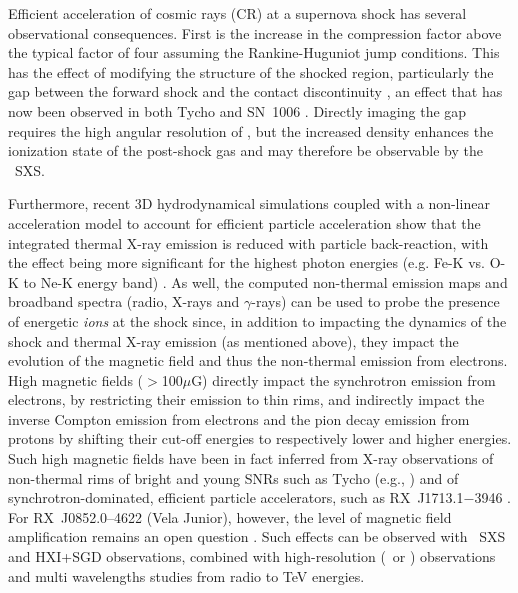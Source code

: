 \documentclass[11pt,a4paper]{article}
\begin{document}
{Efficient acceleration of cosmic rays (CR) at a supernova shock has
several observational consequences.  First is the increase in the
compression factor above the typical factor of four assuming the
Rankine-Huguniot jump conditions.  This has the effect of modifying
the structure of the shocked region, particularly the gap between the
forward shock and the contact discontinuity \citep{decourchelle00}, an
effect that has now been observed in both Tycho \citep{warren05} and
SN~1006 \citep{gamil08, miceli12}. Directly imaging the gap requires the high
angular resolution of \chandra, but the increased density enhances the
ionization state of the post-shock gas \citep{patnaude09} and may
therefore be observable by the \ah\ SXS.  

Furthermore, recent 3D hydrodynamical simulations coupled
with a non-linear acceleration model to account for efficient particle acceleration
show that the integrated thermal X-ray emission is reduced with particle back-reaction, 
with the effect being more significant for the highest photon energies (e.g. Fe-K vs. O-K to Ne-K energy band) \citep{ferrand12}.
As well, the computed non-thermal emission maps and broadband spectra (radio, X-rays and $\gamma$-rays)
can be used to probe the presence of energetic \textit{ions} at the shock \citep{ferrand14} 
since, in addition to impacting the dynamics of the shock and thermal X-ray emission (as mentioned above),
they impact the evolution of the magnetic field and thus the non-thermal emission from electrons.
High magnetic fields ($>$100$\mu$G) directly impact the synchrotron emission from electrons,
by restricting their emission to thin rims, and indirectly impact the inverse Compton
emission from electrons and the pion decay emission from protons by shifting
their cut-off energies to respectively lower and higher energies.
Such high magnetic fields have been in fact inferred from X-ray observations of
non-thermal rims of bright and young SNRs such as Tycho (e.g., \citealt{slane14})  
and of synchrotron-dominated, efficient particle accelerators, such as RX~J1713.1$-$3946 \citep{Uchiyama07}.
For RX~J0852.0--4622 (Vela Junior), however, the level of magnetic field amplification remains an open question \citep{lee13, Aharonian07, 
berezhko09, bamba05b}.
Such effects can be observed with \ah\ SXS and HXI+SGD observations, combined with 
high-resolution (\chandra\ or \xmm) observations and
multi wavelengths studies from radio to TeV energies.

}
\end{document}
